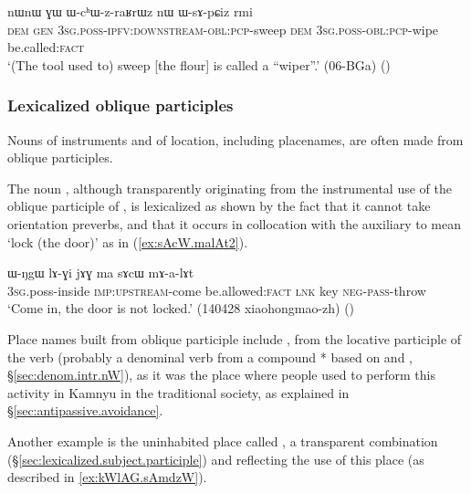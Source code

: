 \begin{exe}
\ex \label{ex:WchWzraRWz}
\gll  nɯnɯ ɣɯ ɯ-cʰɯ-z-raʁrɯz nɯ ɯ-sɤ-pɕiz rmi \\ 
\textsc{dem} \textsc{gen} \textsc{3sg}.\textsc{poss}-\textsc{ipfv}:\textsc{downstream}-\textsc{obl}:\textsc{pcp}-sweep \textsc{dem}  \textsc{3sg}.\textsc{poss}-\textsc{obl}:\textsc{pcp}-wipe be.called:\textsc{fact} \\
\glt `(The tool used to) sweep [the flour] is called a ``wiper''.' (06-BGa) 	()
\end{exe}

\subsubsection{Lexicalized oblique participles} \label{sec:lexicalized.oblique.participle}
Nouns of instruments and of location, including placenames, are often made from oblique participles. 

The noun , although transparently originating from the instrumental use of the oblique participle of , is lexicalized as shown by the fact that it cannot take orientation preverbs, and that it occurs in collocation with the auxiliary  to mean `lock (the door)' as in (\ref{ex:sAcW.malAt2}).

\begin{exe}
\ex \label{ex:sAcW.malAt2}
\gll   ɯ-ŋgɯ lɤ-ɣi jɤɣ ma sɤcɯ mɤ-a-lɤt \\
\textsc{3sg}.poss-inside \textsc{imp}:\textsc{upstream}-come be.allowed:\textsc{fact} \textsc{lnk} key \textsc{neg}-\textsc{pass}-throw \\
\glt `Come in, the door is not locked.' (140428  xiaohongmao-zh) ()
\end{exe}

Place names built from oblique participle include , from the locative participle  of the verb  (probably a denominal verb from a compound * based on  and , §\ref{sec:denom.intr.nW}), as it was the place where people used to perform this activity in Kamnyu in the traditional society, as explained in §\ref{sec:antipassive.avoidance}.
 
Another example is the uninhabited place called , a transparent combination   (§\ref{sec:lexicalized.subject.participle}) and  reflecting the use of this place (as described in \ref{ex:kWlAG.sAmdzW}).

